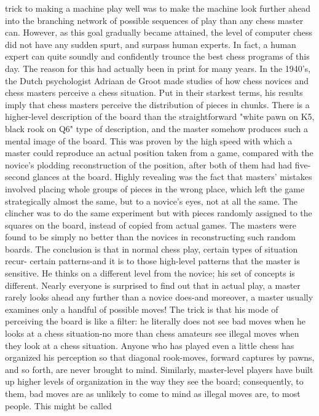 trick to making a machine play well was to make the machine look further ahead into the
branching network of possible sequences of play than any chess master can. However, as
this goal gradually became attained, the level of computer chess did not have any sudden
spurt, and surpass human experts. In fact, a human expert can quite soundly and
confidently trounce the best chess programs of this day.
         The reason for this had actually been in print for many years. In the 1940's, the
Dutch psychologist Adriaan de Groot made studies of how chess novices and chess
masters perceive a chess situation. Put in their starkest terms, his results imply that chess
masters perceive the distribution of pieces in chunks. There is a higher-level description
of the board than the straightforward "white pawn on K5, black rook on Q6" type of
description, and the master somehow produces such a mental image of the board. This
was proven by the high speed with which a master could reproduce an actual position
taken from a game, compared with the novice's plodding reconstruction of the position,
after both of them had had five-second glances at the board. Highly revealing was the fact
that masters' mistakes involved placing whole groups of pieces in the wrong place, which
left the game strategically almost the same, but to a novice's eyes, not at all the same. The
clincher was to do the same experiment but with pieces randomly assigned to the squares
on the board, instead of copied from actual games. The masters were found to be simply
no better than the novices in reconstructing such random boards.
         The conclusion is that in normal chess play, certain types of situation recur-
certain patterns-and it is to those high-level patterns that the master is sensitive. He thinks
on a different level from the novice; his set of concepts is different. Nearly everyone is
surprised to find out that in actual play, a master rarely looks ahead any further than a
novice does-and moreover, a master usually examines only a handful of possible moves!
The trick is that his mode of perceiving the board is like a filter: he literally does not see
bad moves when he looks at a chess situation-no more than chess amateurs see illegal
moves when they look at a chess situation. Anyone who has played even a little chess has
organized his perception so that diagonal rook-moves, forward captures by pawns, and so
forth, are never brought to mind. Similarly, master-level players have built up higher
levels of organization in the way they see the board; consequently, to them, bad moves
are as unlikely to come to mind as illegal moves are, to most people. This might be called
